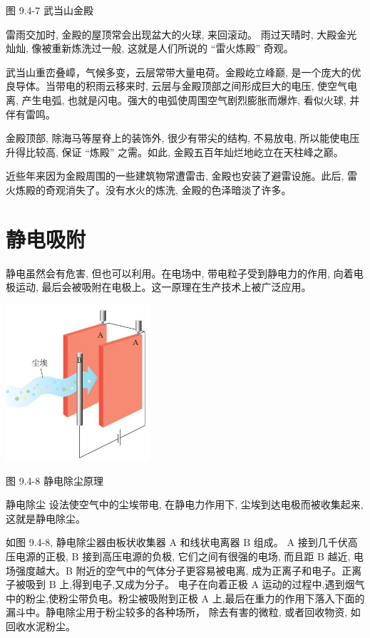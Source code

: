 \documentclass[10pt]{article}
\begin{document}
图 9.4-7 武当山金殿

雷雨交加时, 金殿的屋顶常会出现盆大的火球, 来回滚动。 雨过天晴时, 大殿金光灿灿, 像被重新炼洗过一般, 这就是人们所说的 “雷火炼殿” 奇观。

武当山重峦叠嶂，气候多变，云层常带大量电荷。金殿屹立峰巅, 是一个庞大的优良导体。当带电的积雨云移来时, 云层与金殿顶部之间形成巨大的电压, 使空气电离, 产生电弧, 也就是闪电。强大的电弧使周围空气剧烈膨胀而爆炸, 看似火球, 并伴有雷鸣。

金殿顶部, 除海马等屋脊上的装饰外, 很少有带尖的结构, 不易放电, 所以能使电压升得比较高, 保证 “炼殿” 之需。如此, 金殿五百年灿烂地屹立在天柱峰之巅。

近些年来因为金殿周围的一些建筑物常遭雷击, 金殿也安装了避雷设施。此后, 雷火炼殿的奇观消失了。没有水火的炼洗, 金殿的色泽暗淡了许多。

\section*{静电吸附}

静电虽然会有危害, 但也可以利用。在电场中, 带电粒子受到静电力的作用, 向着电极运动, 最后会被吸附在电极上。这一原理在生产技术上被广泛应用。

\begin{center}
\includegraphics[max width=0.4\textwidth]{images/01911d5f-8e38-70c0-b5b8-2b399bd115b6_26_651795.jpg}
\end{center}

图 9.4-8 静电除尘原理

静电除尘 设法使空气中的尘埃带电, 在静电力作用下, 尘埃到达电极而被收集起来, 这就是静电除尘。

如图 9.4-8, 静电除尘器由板状收集器 A 和线状电离器 \(\mathrm{B}\) 组成。 \(\mathrm{A}\) 接到几千伏高压电源的正极, \(\mathrm{B}\) 接到高压电源的负极, 它们之间有很强的电场, 而且距 B 越近, 电场强度越大。B 附近的空气中的气体分子更容易被电离, 成为正离子和电子。正离子被吸到 \(\mathrm{B}\) 上,得到电子,又成为分子。 电子在向着正极 \(\mathrm{A}\) 运动的过程中,遇到烟气中的粉尘,使粉尘带负电。粉尘被吸附到正极 \(\mathrm{A}\) 上,最后在重力的作用下落入下面的漏斗中。静电除尘用于粉尘较多的各种场所， 除去有害的微粒, 或者回收物资, 如回收水泥粉尘。
\end{document}
